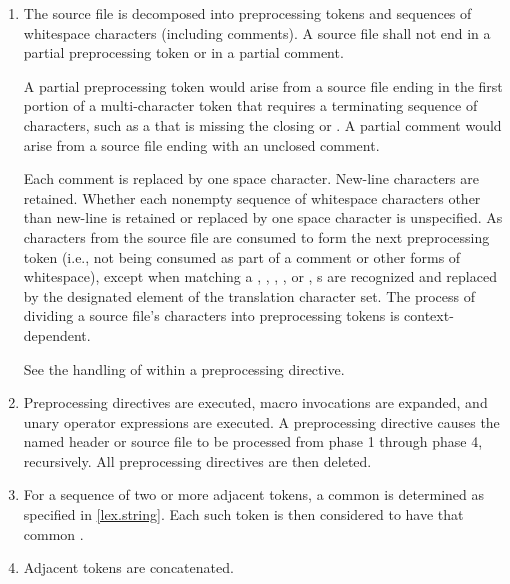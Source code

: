 \begin{enumerate}
\item The source file is decomposed into preprocessing
tokens and sequences of whitespace characters
(including comments). A source file shall not end in a partial
preprocessing token or in a partial comment.
\begin{footnote}
A partial preprocessing
token would arise from a source file
ending in the first portion of a multi-character token that requires a
terminating sequence of characters, such as a 
that is missing the closing 
or \tcode{>}. A partial comment
would arise from a source file ending with an unclosed \tcode{/*}
comment.
\end{footnote}
Each comment is replaced by one space character. New-line characters are
retained. Whether each nonempty sequence of whitespace characters other
than new-line is retained or replaced by one space character is
unspecified.
As characters from the source file are consumed
to form the next preprocessing token
(i.e., not being consumed as part of a comment or other forms of whitespace),
except when matching a
,
,
,
, or
,
s are recognized and
replaced by the designated element of the translation character set.
The process of dividing a source file's
characters into preprocessing tokens is context-dependent.
\begin{example}
See the handling of \tcode{<} within a  preprocessing
directive.
\end{example}

\item Preprocessing directives are executed, macro invocations are
expanded, and  unary operator expressions are executed.
A  preprocessing directive causes the named header or
source file to be processed from phase 1 through phase 4, recursively.
All preprocessing directives are then deleted.

\item
For a sequence of two or more adjacent  tokens,
a common  is determined
as specified in \ref{lex.string}.
Each such  token is then considered to have
that common .

\item
Adjacent  tokens are concatenated.


\end{enumerate}
